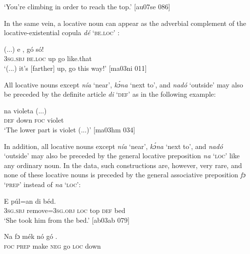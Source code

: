 \glt ‘You’re climbing in order to reach the top.’ [au07se 086]
\z

In the same vein, a locative noun can appear as the adverbial complement of the locative-existential copula \textit{dé} \textsc{‘be.loc’} :


\ea%
    \label{ex:key:912}
    \gll (...)  e        ,  gó  só!\\
{}  \textsc{3sg.sbj}  \textsc{be.loc}  up  go  like.that\\

\glt ‘(...) it’s [farther] up, go this way!’ [ma03ni 011]
\z

All locative nouns except \textit{nía} ‘near’, \textit{kɔ́na} ‘next to’, and \textit{nadó} ‘outside’ may also be preceded by the definite article \textit{di} ‘\textsc{def}’ as in the following example: 


\ea%
    \label{ex:key:913}
    \gll {}      na  violeta  (...)\\
 \textsc{def}  down  \textsc{foc}  violet\\

\glt ‘The lower part is violet (...)’ [ma03hm 034]\\
\z

In addition, all locative nouns except \textit{nía} ‘near’, \textit{kɔ́na} ‘next to’, and \textit{nadó} ‘outside’ may also be preceded by the general locative preposition \textit{na} ‘\textsc{loc}’ like any ordinary noun. In the data, such constructions are, however, very rare, and none of these locative nouns is preceded by the general associative preposition \textit{fɔ} ‘\textsc{prep}’ instead of \textit{na} ‘\textsc{loc}’: 


\ea%
    \label{ex:key:914}
    \gll E    púl=an          di  béd.\\
\textsc{3sg.sbj}  remove=\textsc{3sg.obj}  \textsc{loc}  top    \textsc{def}  bed\\

\glt ‘She took him from the bed.’ [ab03ab 079]
\z


\ea%
    \label{ex:key:915}
    \gll Na  fɔ  mék    nó  gó    .\\
\textsc{foc}  \textsc{prep}  make  \textsc{neg}  go  \textsc{loc}  down\\

